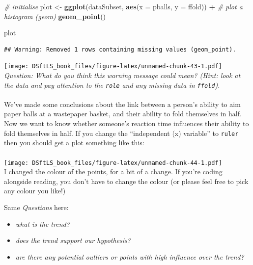 \documentclass[
]{book}
\newenvironment{Shaded}{\begin{snugshade}}{\end{snugshade}}
\newcommand{\CommentTok}[1]{\textcolor[rgb]{0.56,0.35,0.01}{\textit{#1}}}
\newcommand{\DataTypeTok}[1]{\textcolor[rgb]{0.13,0.29,0.53}{#1}}
\newcommand{\KeywordTok}[1]{\textcolor[rgb]{0.13,0.29,0.53}{\textbf{#1}}}
\newcommand{\NormalTok}[1]{#1}
\newcommand{\OperatorTok}[1]{\textcolor[rgb]{0.81,0.36,0.00}{\textbf{#1}}}
\newcommand{\StringTok}[1]{\textcolor[rgb]{0.31,0.60,0.02}{#1}}
\providecommand{\tightlist}{%
  \setlength{\itemsep}{0pt}\setlength{\parskip}{0pt}}
\begin{document}
\begin{Shaded}
\begin{Highlighting}[]
\CommentTok{# initialise}
\NormalTok{plot <-}\StringTok{ }\KeywordTok{ggplot}\NormalTok{(dataSubset, }\KeywordTok{aes}\NormalTok{(}\DataTypeTok{x =}\NormalTok{ pballs, }\DataTypeTok{y =}\NormalTok{ ffold)) }\OperatorTok{+}
\StringTok{    }\CommentTok{# plot a histogram (geom)}
\StringTok{    }\KeywordTok{geom_point}\NormalTok{()}

\NormalTok{plot}
\end{Highlighting}
\end{Shaded}

\begin{verbatim}
## Warning: Removed 1 rows containing missing values (geom_point).
\end{verbatim}

\texttt{[image: DSftLS\_book\_files/figure-latex/unnamed-chunk-43-1.pdf]}\\

\emph{Question: What do you think this warning message could mean? (Hint: look
at the data and pay attention to the \texttt{role} and any missing data in \texttt{ffold}).}\\
~\\

We've made some conclusions about the link between a person's ability to
aim paper balls at a wastepaper basket, and their ability to fold themselves in half.
Now we want to know whether someone's reaction time influences their ability
to fold themselves in half. If you change the ``independent (x) variable'' to
\texttt{ruler} then you should get a plot something like this:\\
~\\
\texttt{[image: DSftLS\_book\_files/figure-latex/unnamed-chunk-44-1.pdf]}\\

I changed the colour of the points, for a bit of a change. If you're coding
alongside reading, you don't have to change the colour
(or please feel free to pick any colour you like!)

Same \emph{Questions} here:

\begin{itemize}
\tightlist
\item
  \emph{what is the trend?}
\item
  \emph{does the trend support our hypothesis?}
\item
  \emph{are there any potential outliers or points with high influence over the trend?}\\
  ~\\
\end{itemize}
\end{document}
